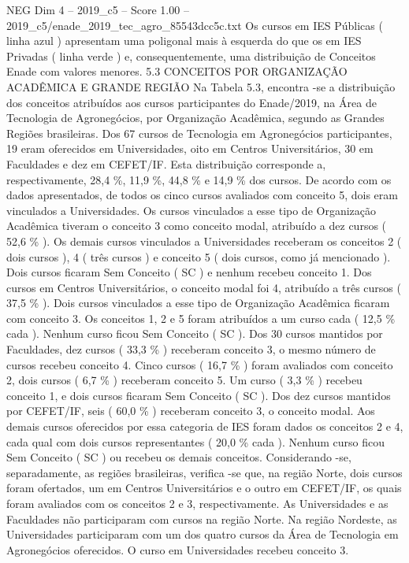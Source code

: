 \begin{textsample}{NEG Dim 4 – 2019\_c5 – Score 1.00 – 2019\_c5/enade\_2019\_tec\_agro\_85543dcc5c.txt}
Os cursos em IES Públicas ( linha azul ) apresentam uma poligonal mais à esquerda do que os em IES Privadas ( linha verde ) e, consequentemente, uma distribuição de Conceitos Enade com valores menores. 5.3 CONCEITOS POR ORGANIZAÇÃO ACADÊMICA E GRANDE REGIÃO Na Tabela 5.3, encontra -se a distribuição dos conceitos atribuídos aos cursos participantes do Enade/2019, na Área de Tecnologia de Agronegócios, por Organização Acadêmica, segundo as Grandes Regiões brasileiras.
Dos 67 cursos de Tecnologia em Agronegócios participantes, 19 eram oferecidos em Universidades, oito em Centros Universitários, 30 em Faculdades e dez em CEFET/IF.
Esta distribuição corresponde a, respectivamente, 28,4 \%, 11,9 \%, 44,8 \% e 14,9 \% dos cursos.
De acordo com os dados apresentados, de todos os cinco cursos avaliados com conceito 5, dois eram vinculados a Universidades.
Os cursos vinculados a esse tipo de Organização Acadêmica tiveram o conceito 3 como conceito modal, atribuído a dez cursos ( 52,6 \% ).
Os demais cursos vinculados a Universidades receberam os conceitos 2 ( dois cursos ), 4 ( três cursos ) e conceito 5 ( dois cursos, como já mencionado ).
Dois cursos ficaram Sem Conceito ( SC ) e nenhum recebeu conceito 1.
Dos cursos em Centros Universitários, o conceito modal foi 4, atribuído a três cursos ( 37,5 \% ).
Dois cursos vinculados a esse tipo de Organização Acadêmica ficaram com conceito 3.
Os conceitos 1, 2 e 5 foram atribuídos a um curso cada ( 12,5 \% cada ).
Nenhum curso ficou Sem Conceito ( SC ).
Dos 30 cursos mantidos por Faculdades, dez cursos ( 33,3 \% ) receberam conceito 3, o mesmo número de cursos recebeu conceito 4.
Cinco cursos ( 16,7 \% ) foram avaliados com conceito 2, dois cursos ( 6,7 \% ) receberam conceito 5.
Um curso ( 3,3 \% ) recebeu conceito 1, e dois cursos ficaram Sem Conceito ( SC ).
Dos dez cursos mantidos por CEFET/IF, seis ( 60,0 \% ) receberam conceito 3, o conceito modal.
Aos demais cursos oferecidos por essa categoria de IES foram dados os conceitos 2 e 4, cada qual com dois cursos representantes ( 20,0 \% cada ).
Nenhum curso ficou Sem Conceito ( SC ) ou recebeu os demais conceitos.
Considerando -se, separadamente, as regiões brasileiras, verifica -se que, na região Norte, dois cursos foram ofertados, um em Centros Universitários e o outro em CEFET/IF, os quais foram avaliados com os conceitos 2 e 3, respectivamente.
As Universidades e as Faculdades não participaram com cursos na região Norte.
Na região Nordeste, as Universidades participaram com um dos quatro cursos da Área de Tecnologia em Agronegócios oferecidos.
O curso em Universidades recebeu conceito 3.

\end{textsample}
